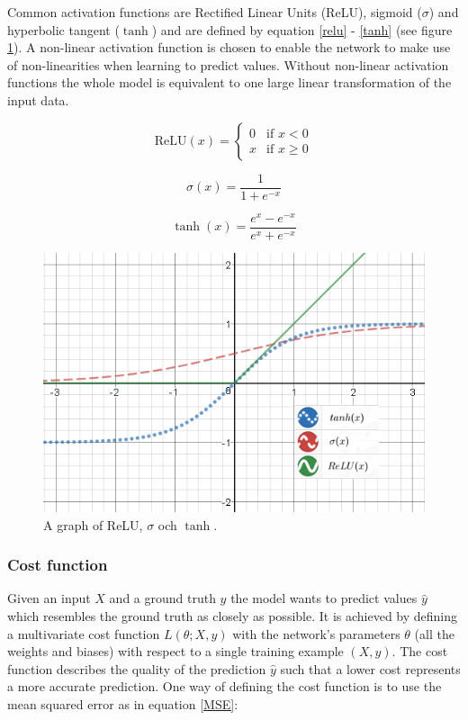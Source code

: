 \documentclass[a4paper,11pt,twoside]{article}
\begin{document}
Common activation functions are Rectified Linear Units (ReLU), sigmoid ($\sigma$) and hyperbolic tangent ($\tanh$) and are defined by equation \eqref{relu} - \eqref{tanh} (see figure \ref{activation_function}). A non-linear activation function is chosen to enable the network to make use of non-linearities when learning to predict values. Without non-linear activation functions the whole model is equivalent to one large linear transformation of the input data. \cite{cs231n}

\begin{equation}\label{relu}
\mbox{ReLU}{(x)} = \begin{cases} 
			0 & \mbox{if } x < 0 \\ 
			x & \mbox{if } x \geq 0 
		\end{cases}
\end{equation}

\begin{equation}\label{sigmoid}
\sigma(x) = \frac{1}{1+e^{-x}}
\end{equation}

\begin{equation}\label{tanh}
\tanh{(x)} = \frac{e^x-e^{-x}}{e^x+e^{-x}}
\end{equation}

\begin{figure}[h]
	\centering
  		\includegraphics[scale=0.83]{activationfunction.png}
  	\caption{A graph of ReLU, $\sigma$ och $\tanh$.} \label{activation_function}
\end{figure}

\subsubsection{Cost function}
Given an input $X$ and a ground truth $y$ the model wants to predict values $\hat{y}$ which resembles the ground truth as closely as possible. It is achieved by defining a multivariate cost function $L(\theta; X, y)$  with the network's parameters $\theta$ (all the weights and biases) with respect to a single training example $(X, y)$. The cost function describes the quality of the prediction $\hat{y}$ such that a lower cost represents a more accurate prediction. One way of defining the cost function is to use the mean squared error as in equation \eqref{MSE}:
\end{document}
